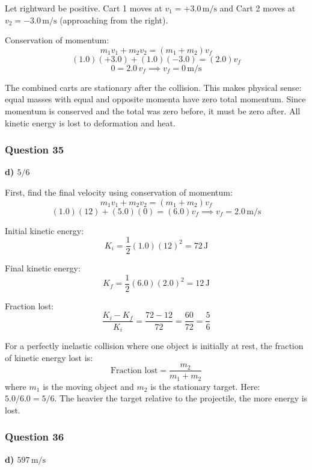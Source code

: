 \documentclass[12pt,letterpaper]{article}
\begin{document}
\begin{explanationbox}
Let rightward be positive. Cart 1 moves at $v_1 = +3.0\,\text{m/s}$ and Cart 2 moves at $v_2 = -3.0\,\text{m/s}$ (approaching from the right).

Conservation of momentum:
\[
m_1 v_1 + m_2 v_2 = (m_1 + m_2)v_f
\]
\[
(1.0)(+3.0) + (1.0)(-3.0) = (2.0)v_f
\]
\[
0 = 2.0\,v_f \implies v_f = 0\,\text{m/s}
\]

The combined carts are stationary after the collision. This makes physical sense: equal masses with equal and opposite momenta have zero total momentum. Since momentum is conserved and the total was zero before, it must be zero after. All kinetic energy is lost to deformation and heat.
\end{explanationbox}

\subsubsection*{Question 35}

\begin{answerbox}
\textbf{d) $5/6$}
\end{answerbox}

\begin{explanationbox}
First, find the final velocity using conservation of momentum:
\[
m_1 v_1 + m_2 v_2 = (m_1 + m_2)v_f
\]
\[
(1.0)(12) + (5.0)(0) = (6.0)v_f \implies v_f = 2.0\,\text{m/s}
\]

Initial kinetic energy:
\[
K_i = \frac{1}{2}(1.0)(12)^2 = 72\,\text{J}
\]

Final kinetic energy:
\[
K_f = \frac{1}{2}(6.0)(2.0)^2 = 12\,\text{J}
\]

Fraction lost:
\[
\frac{K_i - K_f}{K_i} = \frac{72 - 12}{72} = \frac{60}{72} = \frac{5}{6}
\]

For a perfectly inelastic collision where one object is initially at rest, the fraction of kinetic energy lost is:
\[
\text{Fraction lost} = \frac{m_2}{m_1 + m_2}
\]
where $m_1$ is the moving object and $m_2$ is the stationary target. Here: $5.0/6.0 = 5/6$. The heavier the target relative to the projectile, the more energy is lost.
\end{explanationbox}

\subsubsection*{Question 36}

\begin{answerbox}
\textbf{d) $597\,\text{m/s}$}
\end{answerbox}
\end{document}
